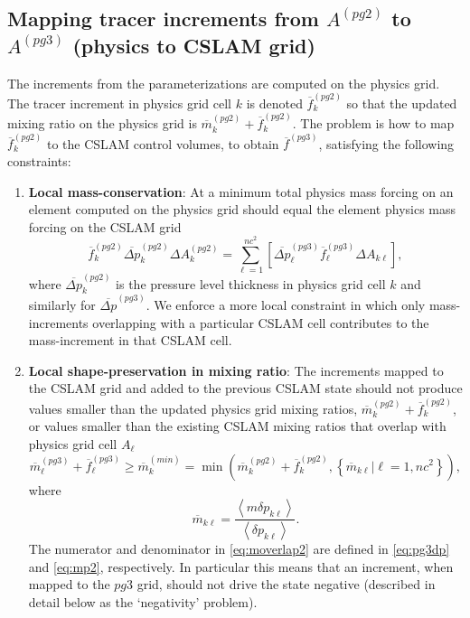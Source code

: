 \documentclass[draft,linenumbers]{agujournal}
\begin{document}
\subsection{Mapping tracer increments from $A^{(pg2)}$ to $A^{(pg3)}$ (physics to CSLAM grid)}\label{sec:pgtonc}
The increments from the parameterizations are computed on the physics grid. The tracer increment in physics grid cell $k$ is denoted $\overline{f}_k^{(pg2)}$ so that the updated mixing ratio on the physics grid is ${\overline{m}}^{(pg2)}_k+\overline{f}_k^{(pg2)}$. The problem is how to map $\overline{f}_k^{(pg2)}$ to the CSLAM control volumes, to obtain ${\overline{f}}^{(pg3)}$, satisfying the following constraints:
\begin{enumerate}
\item {\bf{Local mass-conservation}}: At a minimum total physics mass forcing on an element computed on the physics grid should equal the element physics mass forcing on the CSLAM grid
\begin{equation}
{\overline{f}}_k^{(pg2)}{\overline{\Delta p}}^{(pg2)}_k\Delta A_k^{(pg2)}=\sum_{\ell=1}^{nc^2}\left[{\overline{\Delta p}}^{(pg3)}_\ell {\overline{f}}^{(pg3)}_\ell\Delta A_{k\ell}\right],
\end{equation}
where $\overline{\Delta p}^{(pg2)}_k$ is the pressure level thickness in physics grid cell $k$ and similarly for $\overline{\Delta p}^{(pg3)}$. We enforce a more local constraint in which only mass-increments overlapping with a particular CSLAM cell contributes to the mass-increment in that CSLAM cell.
\item {\bf{Local shape-preservation in mixing ratio}}: The increments mapped to the CSLAM grid and added to the previous CSLAM state should not produce values smaller than the updated physics grid mixing ratios, ${\overline{m}}^{(pg2)}_k+\overline{f}_k^{(pg2)}$, or values smaller than the existing CSLAM mixing ratios that overlap with physics grid cell $A_\ell$
\begin{equation}
\label{eq:min}
\overline{m}^{(pg3)}_\ell+{\overline{f}}^{(pg3)}_\ell \ge \overline{m}^{(min)}_k=\min \left( {\overline{m}}^{(pg2)}_k+{\overline{f}}_k^{(pg2)},\left\{ {\overline{m}}_{k\ell} |\ell=1,nc^2\right\} \right),
\end{equation}
where
\begin{equation}
\label{eq:moverlap2}
\overline{m}_{k\ell}=\frac{\left< m\delta p_{k\ell}\right> }{\left< \delta p_{k\ell}\right>}.
\end{equation}
The numerator and denominator in \eqref{eq:moverlap2} are defined in \eqref{eq:pg3dp} and \eqref{eq:mp2}, respectively. In particular this means that an increment, when mapped to the $pg3$ grid, should not drive the state negative (described in detail below as the `negativity' problem).


\end{enumerate}
\end{document}
